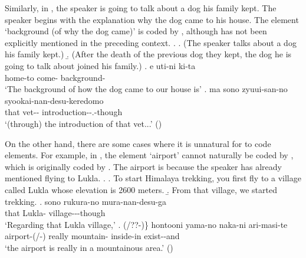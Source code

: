 Similarly, in \Next[c],
the speaker is going to talk about a dog his family kept.
The speaker begins with the explanation why the dog came to his house.
The element  `background (of why the dog came)' is coded by ,
although  has not been explicitly mentioned in the preceding context.
%
\ex.
 \a. (The speaker talks about a dog his family kept.)
 \b. (After the death of the previous dog they kept, the dog he is going to talk about joined his family.)
 \bg. e uti-ni ki-ta  \\
 	 home-to come- background- \\
	`The background of how the dog came to our house is'
 \bg. ma sono zyuui-san-no syookai-nan-desu-keredomo \\
 	 that vet-- introduction--.-though \\
	`(through) the introduction of that vet...'
	\hfill{()}


On the other hand,
there are some cases where it is unnatural for  to code  elements.
For example, in \Next[c],
the element  `airport' cannot naturally be coded by ,
which is originally coded by .
The airport is  because the speaker has already mentioned flying to Lukla.
\ex.
%
	\a. To start Himalaya trekking, you first fly to a village called Lukla whose elevation is 2600 meters.
	\b. From that village, we started trekking.
	\bg. sono rukura-no mura-nan-desu-ga \\
		that Lukla- village---though \\
		`Regarding that Lukla village,'
	\bg. (/??-)\} hontooni yama-no naka-ni ari-masi-te \\
		airport-(/-) really mountain- inside-in exist--and \\
		`the airport is really in a mountainous area.'
	\hfill{()}


